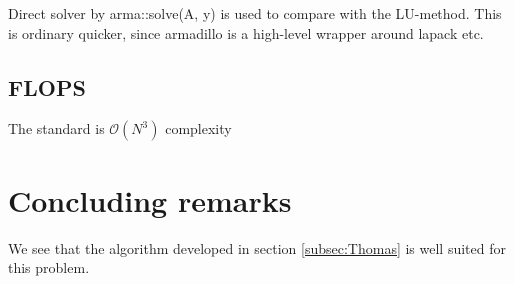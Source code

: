 \documentclass[11pt,a4paper,english,final]{article}
\numberwithin{equation}{section}
\newcommand{\bigO}[1]{\mathcal{O}\left( #1 \right)}
\begin{document}
Direct solver by arma::solve(A, y) is used to compare with the LU-method.
This is ordinary quicker, since armadillo is a high-level wrapper around
lapack etc.

\subsection{FLOPS}
The standard is $\bigO{N^3}$ complexity

\section{Concluding remarks}


We see that the algorithm developed in section \ref{subsec:Thomas} is 
well suited for this problem.
\end{document}
